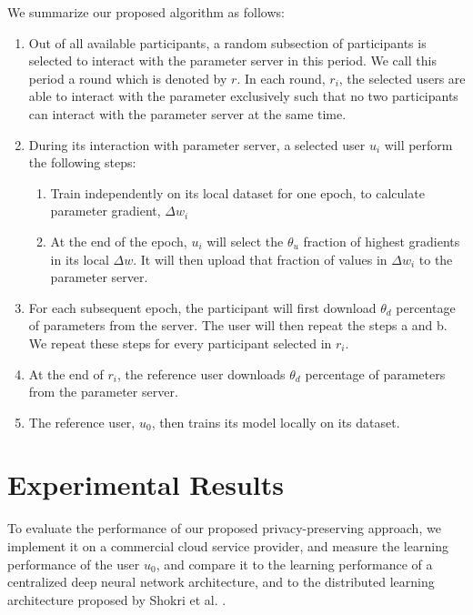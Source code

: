 \documentclass[conference]{IEEEtran}
\begin{document}
We summarize our proposed algorithm as follows:
\begin {enumerate}
\item Out of all available participants, a random subsection of participants is selected to interact with the parameter server in this
period. We call this period a round which is denoted by $r$. In each round, $r_i$, the selected users are able to interact with the parameter exclusively such that no two
participants can interact with the parameter server at the same time.
\item During its interaction with parameter server, a selected user $u_i$ will perform the following steps:
\begin {enumerate}
  \item Train independently on its local dataset for one epoch, to calculate parameter gradient, $\Delta w_i$ 
  \item  At the end of the epoch, $u_i$ will select the $\theta_u$ fraction of highest gradients in its local $\Delta w$. It will then upload that fraction of values in $\Delta w_i$ to the parameter server.
  \end {enumerate}
\item For each subsequent epoch, the participant will first download $\theta_d$ percentage of parameters from the server. The
user will then repeat the steps a and b. We repeat these steps for every participant selected in $r_i$.
\item At the end of $r_i$, the reference user downloads $\theta_d$ percentage of parameters from the parameter server.
\item The reference user, $u_0$, then trains its model locally on its dataset. 
\end {enumerate}




\section{Experimental Results}

To evaluate the performance of our proposed privacy-preserving approach, we implement it on a commercial cloud service provider, and
measure the learning performance of the user $u_0$, and compare it to the learning performance of a centralized deep neural network
architecture, and to the distributed learning architecture proposed by Shokri et al. \cite{shokri2015privacy}. 
\end{document}
